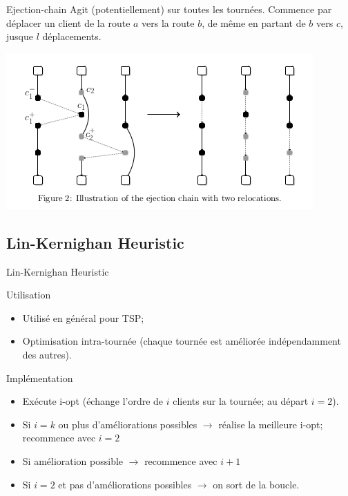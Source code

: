 \documentclass{beamer}
\begin{document}
\begin{frame}{Ejection-chain}
Agit (potentiellement) sur toutes les tournées. Commence par déplacer un client de la route $a$ vers la route $b$, de même en partant de $b$ vers $c$, jusque $l$ déplacements. 

	\centering
	\includegraphics[height=0.4\textheight]{ejection_chain.png}
\end{frame}


\subsection{Lin-Kernighan Heuristic}
\begin{frame}{Lin-Kernighan Heuristic}

\begin{block}{Utilisation}
\begin{itemize}
\item Utilisé en général pour TSP;
\item Optimisation intra-tournée (chaque tournée est améliorée indépendamment des autres).
\end{itemize}
\end{block}

\begin{exampleblock}{Implémentation}
\begin{itemize}
\item Exécute i-opt (échange l'ordre de $i$ clients sur la tournée; au départ $i=2$).
\item Si $i=k$ ou plus d'améliorations possibles $\rightarrow$ réalise la meilleure i-opt; recommence avec $i=2$
\item Si amélioration possible $\rightarrow$ recommence avec $i+1$
\item Si $i=2$ et pas d'améliorations possibles $\rightarrow$ on sort de la boucle.
\end{itemize}
\end{exampleblock}

\end{frame} 
\end{document}
